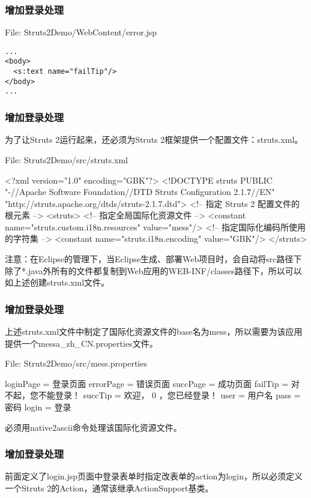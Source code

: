 \begin{frame}[fragile] %
\frametitle{增加登录处理}

File: Struts2Demo/WebContent/error.jsp
{\footnotesize\Blue
\begin{verbatim}
...
<body>
  <s:text name="failTip"/>
</body>
...
\end{verbatim}}
\end{frame}

\begin{frame}[fragile] %
\frametitle{增加登录处理}

为了让Struts 2运行起来，还必须为Struts 2框架提供一个配置文件：struts.xml。

File: Struts2Demo/{\Red src}/struts.xml

\begin{xmlCode}
<?xml version="1.0" encoding="GBK"?>
<!DOCTYPE struts PUBLIC
"-//Apache Software Foundation//DTD Struts Configuration 2.1.7//EN"
"http://struts.apache.org/dtds/struts-2.1.7.dtd">
<!-- 指定 Struts 2 配置文件的根元素 -->
<struts>
  <!-- 指定全局国际化资源文件 -->
  <constant name="struts.custom.i18n.resources" value="mess"/>
  <!-- 指定国际化编码所使用的字符集 -->	
  <constant name="struts.i18n.encoding" value="GBK"/>
</struts>  
\end{xmlCode}

{\kai\Blue 注意：在Eclipse的管理下，当Eclipse生成、部署Web项目时，会自动将src路径下除了*.java外所有的文件都复制到Web应用的WEB-INF/classes路径下，所以可以如上述创建struts.xml文件。}

\end{frame}
\begin{frame}[fragile] %
\frametitle{增加登录处理}

上述struts.xml文件中制定了国际化资源文件的base名为mess，所以需要为该应用提供一个messa\_zh\_CN.properties文件。

File: Struts2Demo/src/mess.properties

\begin{xmlCode}
loginPage = 登录页面
errorPage = 错误页面
succPage = 成功页面
failTip = 对不起，您不能登录！
succTip = 欢迎， {0} ，您已经登录！
user = 用户名
pass = 密码
login = 登录
\end{xmlCode}

必须用native2ascii命令处理该国际化资源文件。
\end{frame}

\begin{frame}[fragile] %
\frametitle{增加登录处理}

前面定义了login.jsp页面中登录表单时指定改表单的action为login，所以必须定义一个Struts
2的Action，通常该继承ActionSupport基类。
\end{frame}


